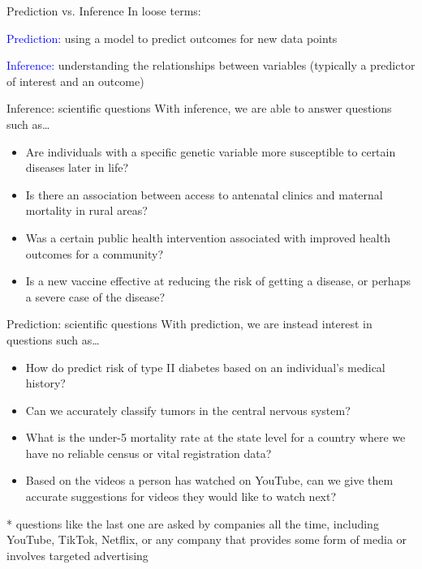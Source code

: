 \documentclass[10pt,t]{beamer}
\begin{document}
\begin{frame}{Prediction vs. Inference}
In loose terms:
\vspace{0.3cm}

\textcolor{blue}{Prediction:} using a model to predict outcomes for new data points

\vspace{0.3cm}

\textcolor{blue}{Inference:} understanding the relationships between variables (typically a predictor of interest and an outcome)
\end{frame}

\begin{frame}{Inference: scientific questions}
With inference, we are able to answer questions such as\dots

\vspace{0.3cm}

\begin{itemize}
	\item Are individuals with a specific genetic variable more susceptible to certain diseases later in life?
	\item Is there an association between access to antenatal clinics and maternal mortality in rural areas?
	\item Was a certain public health intervention associated with improved health outcomes for a community?
	\item Is a new vaccine effective at reducing the risk of getting a disease, or perhaps a severe case of the disease?
\end{itemize}

\end{frame}

\begin{frame}{Prediction: scientific questions}
With prediction, we are instead interest in questions such as\dots

\vspace{0.3cm}

\begin{itemize}
	\item How do predict risk of type II diabetes based on an individual's medical history?
	\item Can we accurately classify tumors in the central nervous system?
	\item What is the under-5 mortality rate at the state level for a country where we have no reliable census or vital registration data?
	\item Based on the videos a person has watched on YouTube, can we give them accurate suggestions for videos they would like to watch next?
\end{itemize}

\vspace{0.3cm} \pause

* questions like the last one are asked by companies all the time, including YouTube, TikTok, Netflix, or any company that provides some form of media or involves targeted advertising 
\end{frame}
\end{document}
